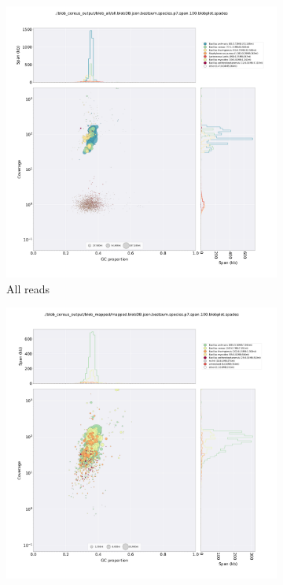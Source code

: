 \documentclass[10pt]{article}
\begin{document}
\begin{figure}[H]
  \centering
  \begin{subfigure}[b]{.5\textwidth}
    \includegraphics[width=.95\textwidth]{all.blobDB.json.bestsum.species.p7.span.100.blobplot.spades.png}
    \caption{All reads}
  \end{subfigure}
  \begin{subfigure}[b]{.5\textwidth}
    \includegraphics[width=.95\textwidth]{mapped.blobDB.json.bestsum.species.p7.span.100.blobplot.spades.png}

\end{subfigure}
\end{figure}
\end{document}
